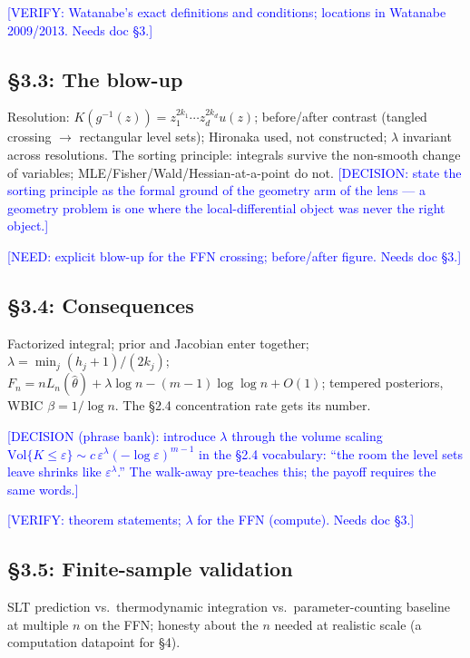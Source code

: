 \documentclass[11pt]{article}
\newcommand{\tagg}[1]{\textcolor{blue}{[#1]}}
\begin{document}
\tagg{VERIFY: Watanabe's exact definitions and conditions; locations in
Watanabe 2009/2013. Needs doc \S3.}

\subsection*{\S3.3: The blow-up}

Resolution: $K(g^{-1}(z))=z_1^{2k_1}\cdots z_d^{2k_d}u(z)$;
before/after contrast (tangled crossing $\to$ rectangular level sets);
Hironaka used, not constructed; $\lambda$ invariant across resolutions.
The sorting principle: integrals survive the non-smooth change of
variables; MLE/Fisher/Wald/Hessian-at-a-point do not. \tagg{DECISION:
state the sorting principle as the formal ground of the geometry arm of
the lens --- a geometry problem is one where the local-differential
object was never the right object.}

\tagg{NEED: explicit blow-up for the FFN crossing; before/after figure.
Needs doc \S3.}

\subsection*{\S3.4: Consequences}

Factorized integral; prior and Jacobian enter together; $\lambda=\min_j
(h_j+1)/(2k_j)$; $F_n=nL_n(\hat\theta)+\lambda\log n-(m-1)\log\log
n+O(1)$; tempered posteriors, WBIC $\beta=1/\log n$. The \S2.4
concentration rate gets its number.

\tagg{DECISION (phrase bank): introduce $\lambda$ through the volume
scaling $\mathrm{Vol}\{K \le \varepsilon\} \sim
c\,\varepsilon^{\lambda}(-\log\varepsilon)^{m-1}$ in the \S2.4
vocabulary: ``the room the level sets leave shrinks like
$\varepsilon^{\lambda}$.'' The walk-away pre-teaches this; the payoff
requires the same words.}

\tagg{VERIFY: theorem statements; $\lambda$ for the FFN (compute). Needs
doc \S3.}

\subsection*{\S3.5: Finite-sample validation}

SLT prediction vs.\ thermodynamic integration vs.\ parameter-counting
baseline at multiple $n$ on the FFN; honesty about the $n$ needed at
realistic scale (a computation datapoint for \S4).

\end{document}
